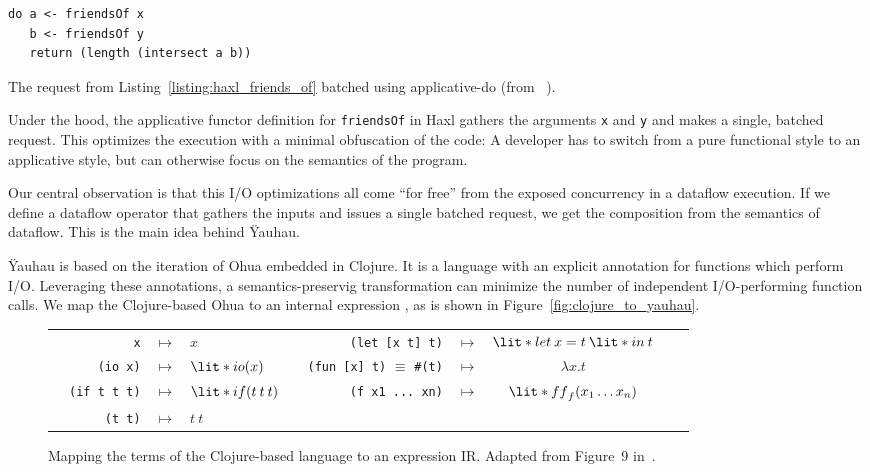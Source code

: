 \begin{listing}
\begin{verbatim}
do a <- friendsOf x
   b <- friendsOf y
   return (length (intersect a b))
\end{verbatim}
\caption{The request from Listing~\ref{listing:haxl_friends_of} batched using applicative-do (from ~\cite{marlow2014haxl}).}
\label{listing:haxl_applicative_do}
\end{listing}

Under the hood, the applicative functor definition for \texttt{friendsOf} in Haxl gathers the arguments \texttt{x} and \texttt{y} and makes a single, batched request.
This optimizes the execution with a minimal obfuscation of the code:
A developer has to switch from a pure functional style to an applicative style, but can otherwise focus on the semantics of the program.

Our central observation is that this \ac{I/O} optimizations all come ``for free'' from the exposed concurrency in a dataflow execution. 
If we define a dataflow operator that gathers the inputs and issues a single batched request, we get the composition from the semantics of dataflow.
This is the main idea behind \"{Y}auhau.


\"{Y}auhau is based on the iteration of Ohua embedded in Clojure.
It is a language with an explicit annotation for functions which perform \ac{I/O}.
Leveraging these annotations, a semantics-preservig transformation can minimize the number of independent \ac{I/O}-performing function calls.
We map the Clojure-based Ohua to an internal expression , as is shown in Figure~\ref{fig:clojure_to_yauhau}.

\begin{figure}[h]
	\centering
	\begin{tabular}{r r c l r r r c l r}
		&\texttt{x} & $\mapsto$ & $x$ &  &\texttt{(let [x t] t)} & $\mapsto$ & $\lit*{let} \: x = t \: \lit*{in} \: t$ &  \\

	&\texttt{(io x)}&$\mapsto$& $\lit*{io}(x)$ & &\texttt{(fun [x] t)} $\equiv$ \texttt{#(t)} & $\mapsto$ & $\lambda x.t$ &\\ 
	&\texttt{(if t t t)} & $\mapsto$ & $\lit*{if}(t \: t \: t)$  &	 &\texttt{(f x1 ... xn)} & $\mapsto$ & $\lit*{ff}_f(x_1 \ldots x_n)$ & \\
    &\texttt{(t t)} & $\mapsto$ & $t \: t$ & 		%
	\end{tabular}
	
	\caption{Mapping the terms of the Clojure-based language to an expression \acs{IR}. Adapted from Figure~9 in~\cite{ertel_cc18}.}
	\label{fig:clojure_to_yauau}
\end{figure}

